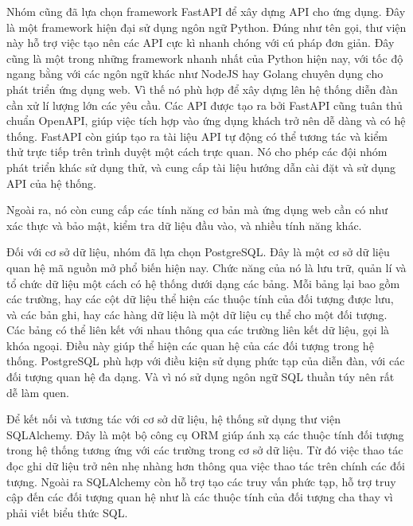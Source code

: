 \documentclass{uetgraduation}
\begin{document}
Nhóm cũng đã lựa chọn framework FastAPI để xây dựng API cho ứng dụng. Đây là một framework hiện đại sử dụng ngôn ngữ Python. Đúng như tên gọi, thư viện này hỗ trợ việc tạo nên các API cực kì nhanh chóng với
cú pháp đơn giản. Đây cũng là một trong những framework nhanh nhất của Python hiện nay, với tốc độ ngang bằng với các ngôn ngữ khác như NodeJS hay Golang chuyên dụng cho phát triển ứng dụng web. Vì thế nó phù hợp
để xây dựng lên hệ thống diễn đàn cần xử lí lượng lớn các yêu cầu. Các API được tạo ra bởi FastAPI cũng tuân thủ chuẩn OpenAPI, giúp việc tích hợp vào ứng dụng khách trở nên dễ dàng và có hệ thống.
FastAPI còn giúp tạo ra tài liệu API tự động có thể tương tác và kiểm thử trực tiếp trên trình duyệt một cách trực quan. Nó cho phép các đội nhóm phát triển khác sử dụng thử, và cung cấp tài liệu hướng dẫn cài đặt và sử dụng API của hệ thống.\par
Ngoài ra, nó còn cung cấp các tính năng cơ bản mà ứng dụng web cần có như xác thực và bảo mật, kiểm tra dữ liệu đầu vào, và nhiều tính năng khác.

Đối với cơ sở dữ liệu, nhóm đã lựa chọn PostgreSQL. Đây là một cơ sở dữ liệu quan hệ mã nguồn mở phổ biến hiện nay. Chức năng của nó là lưu trữ, quản lí và tổ chức dữ liệu một cách có hệ thống dưới dạng các bảng.
Mỗi bảng lại bao gồm các trường, hay các cột dữ liệu thể hiện các thuộc tính của đối tượng được lưu, và các bản ghi, hay các hàng dữ liệu là một dữ liệu cụ thể cho một đối tượng. Các bảng có thể liên kết với nhau thông qua các trường liên kết dữ liệu, gọi là khóa ngoại.
Điều này giúp thể hiện các quan hệ của các đối tượng trong hệ thống. PostgreSQL phù hợp với điều kiện sử dụng phức tạp của diễn đàn, với các đối tượng quan hệ đa dạng. Và vì nó sử dụng ngôn ngữ SQL thuần túy nên rất dễ làm quen.
\par
Để kết nối và tương tác với cơ sở dữ liệu, hệ thống sử dụng thư viện SQLAlchemy. Đây là một bộ công cụ ORM giúp ánh xạ các thuộc tính đối tượng trong hệ thống tương ứng với các trường trong cơ sở dữ liệu. Từ đó việc thao tác đọc ghi dữ liệu trở nên nhẹ nhàng hơn thông qua việc thao tác trên chính các đối tượng.
Ngoài ra SQLAlchemy còn hỗ trợ tạo các truy vấn phức tạp, hỗ trợ truy cập đến các đối tượng quan hệ như là các thuộc tính của đối tượng cha thay vì phải viết biểu thức SQL.
\par
\end{document}
